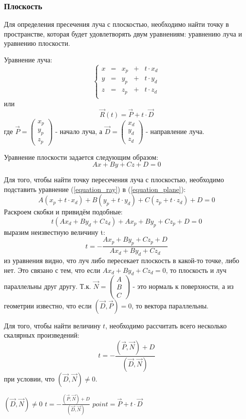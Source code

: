 \documentclass[12pt, a4paper, utf8]{article}
\def\VEC#1#2#3{\left( \begin{array}{c} #1 \\ #2 \\ #3 \end{array} \right) }
\def\VECXYZ#1{\left( \begin{array}{c} x_#1 \\ y_#1 \\ z_#1 \end{array} \right) }
\begin{document}
\subsubsection{Плоскость}
Для определения пресечения луча с плоскостью, необходимо найти точку в пространстве, которая будет удовлетворять двум уравнениям: уравнению луча и уравнению плоскости.
\par
Уравнение луча:
\begin{equation}
\left\{
\begin{array}{ccccc}
x & = & x_p & + & t \cdot x_d \\
y & = & y_p & + & t \cdot y_d \\
z & = & z_p & + & t \cdot z_d \\
\end{array}
\right.
\label{equation_ray}
\end{equation}
или
$$
\vec{R}(t) = \vec{P} + t \cdot \vec{D}
$$
где $\vec{P} = \VECXYZ{p} $ - начало луча, а $\vec{D} = \VECXYZ{d} $ - направление луча. 
\par
Уравнение плоскости задается следующим образом:
\begin{equation}
Ax + By + Cz + D = 0
\label{equation_plane}
\end{equation}
\par
Для того, чтобы найти точку пересечения луча с плоскостью, необходимо подставить уравнение (\ref{equation_ray}) в (\ref{equation_plane}):
$$
A(x_p + t \cdot x_d) + B(y_p + t \cdot y_d) + C(z_p + t \cdot z_d) + D = 0
$$
Раскроем скобки и привидём подобные:
$$
t(Ax_d + By_d + Cz_d ) + Ax_p + By_p + Cz_p + D = 0
$$
выразим неизвестную величину t:
$$
 t = - \frac{Ax_p + By_p + Cz_p + D}{Ax_d + By_d + Cz_d}
$$
из уравнения видно, что луч либо пересекает плоскость в какой-то точке, либо нет. Это связано с тем, что если $Ax_d + By_d + Cz_d = 0$, то плоскость и луч параллельны друг другу. Т.к. $\vec{N} = \VEC{A}{B}{C} $ - это нормаль к поверхности, а из геометрии известно, что если $( \vec{D} , \vec{P} ) = 0$, то вектора параллельны.
\par
   Для того, чтобы найти величину $t$, необходимо рассчитать всего несколько скалярных произведений:
$$
t = - \frac{(\vec{P}, \vec{N}) + D}{(\vec{D}, \vec{N})}
$$
при условии, что $(\vec{D}, \vec{N}) \neq 0$.
\begin{codebox}
\li \If $(\vec{D}, \vec{N}) \neq 0$
\li \Then $ t = - \displaystyle\frac{(\vec{P}, \vec{N}) + D}{(\vec{D}, \vec{N})} $
\li $point = \vec{P} + t \cdot \vec{D}$
\end{codebox}
\end{document}
